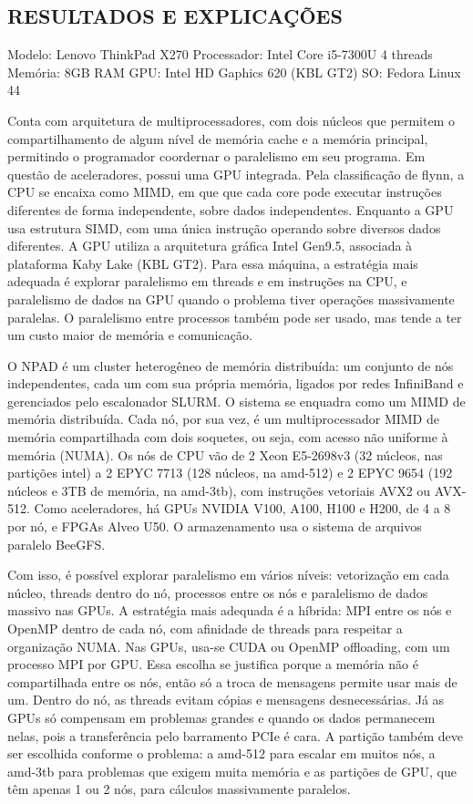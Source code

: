 \documentclass[12pt, openright, oneside, a4paper, brazil]{article}
\newcommand{\subtDois}{RESULTADOS E EXPLICAÇÕES}
\begin{document}
	\subsection{\subtDois}
	\par{Modelo: Lenovo ThinkPad X270
		Processador: Intel Core i5-7300U 4 threads
		Memória: 8GB RAM
		GPU: Intel HD Gaphics 620 (KBL GT2)
		SO: Fedora Linux 44
		
		Conta com arquitetura de multiprocessadores, com dois núcleos que permitem o compartilhamento de algum nível de memória cache e a memória principal, permitindo o programador coordernar o paralelismo em seu programa.
		Em questão de aceleradores, possui uma GPU integrada.
		Pela classificação de flynn, a CPU se encaixa como MIMD, em que que cada core pode executar instruções diferentes de forma independente, sobre dados independentes. Enquanto a GPU usa estrutura SIMD, com uma única instrução operando sobre diversos dados diferentes.
		A GPU utiliza a arquitetura gráfica Intel Gen9.5, associada à plataforma Kaby Lake (KBL GT2).
		Para essa máquina, a estratégia mais adequada é explorar paralelismo em threads e em instruções na CPU, e paralelismo de dados na GPU quando o problema tiver operações massivamente paralelas. O paralelismo entre processos também pode ser usado, mas tende a ter um custo maior de memória e comunicação.
		
		O NPAD é um cluster heterogêneo de memória distribuída: um conjunto de nós independentes, cada um com sua própria memória, ligados por redes InfiniBand e gerenciados pelo escalonador SLURM. O sistema se enquadra como um MIMD de memória distribuída. Cada nó, por sua vez, é um multiprocessador MIMD de memória compartilhada com dois soquetes, ou seja, com acesso não uniforme à memória (NUMA). Os nós de CPU vão de 2 Xeon E5-2698v3 (32 núcleos, nas partições intel) a 2 EPYC 7713 (128 núcleos, na amd-512) e 2 EPYC 9654 (192 núcleos e 3TB de memória, na amd-3tb), com instruções vetoriais AVX2 ou AVX-512. Como aceleradores, há GPUs NVIDIA V100, A100, H100 e H200, de 4 a 8 por nó, e FPGAs Alveo U50. O armazenamento usa o sistema de arquivos paralelo BeeGFS.
		
		Com isso, é possível explorar paralelismo em vários níveis: vetorização em cada núcleo, threads dentro do nó, processos entre os nós e paralelismo de dados massivo nas GPUs. A estratégia mais adequada é a híbrida: MPI entre os nós e OpenMP dentro de cada nó, com afinidade de threads para respeitar a organização NUMA. Nas GPUs, usa-se CUDA ou OpenMP offloading, com um processo MPI por GPU. Essa escolha se justifica porque a memória não é compartilhada entre os nós, então só a troca de mensagens permite usar mais de um. Dentro do nó, as threads evitam cópias e mensagens desnecessárias. Já as GPUs só compensam em problemas grandes e quando os dados permanecem nelas, pois a transferência pelo barramento PCIe é cara. A partição também deve ser escolhida conforme o problema: a amd-512 para escalar em muitos nós, a amd-3tb para problemas que exigem muita memória e as partições de GPU, que têm apenas 1 ou 2 nós, para cálculos massivamente paralelos.}
\end{document}
